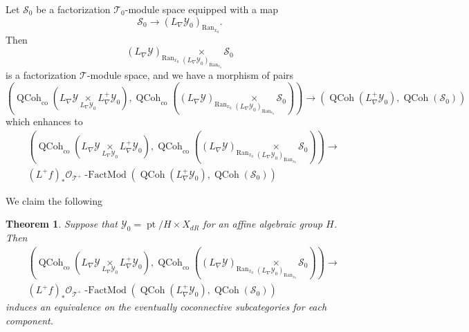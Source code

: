 \documentclass[10pt,a4paper]{amsart}
\newtheorem{thm}[subsubsection]{Theorem}
\newcommand{\on}[1]{\operatorname{#1}}
\newcommand{\QCoh}{\on{QCoh}}
\newcommand{\Ran}{\on{Ran}}
\begin{document}
Let $\mathcal{S}_0$ be a factorization $\mathcal{T}_0$-module space equipped with a map
$$
\mathcal{S}_0 \to (L_{\nabla}\mathcal{Y}_0)_{\Ran_{x_0}}.
$$
Then
$$
(L_{\nabla}\mathcal{Y})_{\Ran_{x_0}} \underset{(L_{\nabla}\mathcal{Y}_0)_{\Ran_{x_0}}}{\times} \mathcal{S}_0
$$
is a factorization $\mathcal{T}$-module space, and we have a morphism of pairs
$$
(\QCoh_{\on{co}}(L_{\nabla}\mathcal{Y} \underset{L_{\nabla}\mathcal{Y}_0}{\times} L_{\nabla}^+\mathcal{Y}_0), \QCoh_{\on{co}}((L_{\nabla}\mathcal{Y})_{\Ran_{x_0}} \underset{(L_{\nabla}\mathcal{Y}_0)_{\Ran_{x_0}}}{\times} \mathcal{S}_0)) \to (\QCoh(L_{\nabla}^+\mathcal{Y}_0), \QCoh(\mathcal{S}_0))
$$
which enhances to
\begin{align}
&(\QCoh_{\on{co}}(L_{\nabla}\mathcal{Y} \underset{L_{\nabla}\mathcal{Y}_0}{\times} L_{\nabla}^+\mathcal{Y}_0), \QCoh_{\on{co}}((L_{\nabla}\mathcal{Y})_{\Ran_{x_0}} \underset{(L_{\nabla}\mathcal{Y}_0)_{\Ran_{x_0}}}{\times} \mathcal{S}_0)) \to \\ &(L^+f)_*\mathcal{O}_{\mathcal{T}^+}\on{-FactMod}(\QCoh(L_{\nabla}^+\mathcal{Y}_0), \QCoh(\mathcal{S}_0))
\end{align}

We claim the following

\begin{thm} \label{approximation}
    Suppose that $\mathcal{Y}_0 = \on{pt}/H \times X_{dR}$ for an affine algebraic group $H$. Then 
    \begin{align}
    &(\QCoh_{\on{co}}(L_{\nabla}\mathcal{Y} \underset{L_{\nabla}\mathcal{Y}_0}{\times} L_{\nabla}^+\mathcal{Y}_0), \QCoh_{\on{co}}((L_{\nabla}\mathcal{Y})_{\Ran_{x_0}} \underset{(L_{\nabla}\mathcal{Y}_0)_{\Ran_{x_0}}}{\times} \mathcal{S}_0)) \to \\ &(L^+f)_*\mathcal{O}_{\mathcal{T}^+}\on{-FactMod}(\QCoh(L_{\nabla}^+\mathcal{Y}_0), \QCoh(\mathcal{S}_0))
    \end{align}
    induces an equivalence on the eventually coconnective subcategories for each component.
\end{thm}
\end{document}

